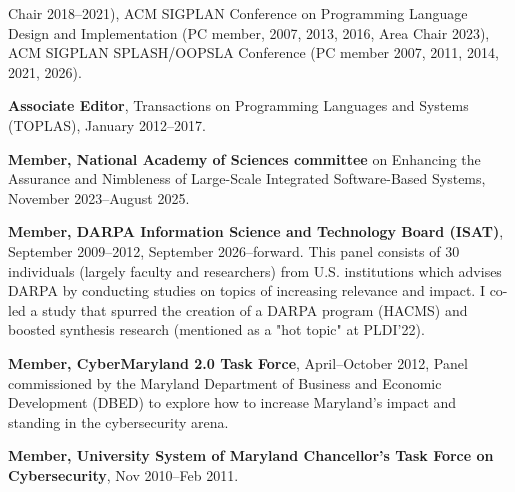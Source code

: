 \documentclass[11pt]{article}
\begin{document}
\begin{description}
  Chair 2018--2021), ACM SIGPLAN Conference on Programming Language
  Design and Implementation (PC member, 2007, 2013, 2016, Area Chair
  2023), ACM SIGPLAN SPLASH/OOPSLA Conference (PC member 2007, 2011, 2014, 2021, 2026).
 \item \textbf{Associate Editor}, Transactions on Programming Languages and
   Systems (TOPLAS), January 2012--2017.
 \item \textbf{Member, National Academy of Sciences committee} on
   Enhancing the Assurance and Nimbleness of Large-Scale Integrated
   Software-Based Systems, November 2023--August 2025.
\item \textbf{Member, DARPA Information Science and Technology Board (ISAT)},
  September 2009--2012, September 2026--forward.  This panel consists of 30
    individuals (largely faculty and researchers) from
    U.S. institutions which advises DARPA by conducting studies on
    topics of increasing relevance and impact. I co-led a study that
    spurred the creation of a DARPA program (HACMS) and boosted
    synthesis research (mentioned as a "hot topic" at PLDI’22).  
\item \textbf{Member, CyberMaryland 2.0 Task Force}, April--October
  2012, Panel commissioned by the Maryland Department of Business and
  Economic Development (DBED) to explore how to increase Maryland's
  impact and standing in the cybersecurity arena.
 \item \textbf{Member, University System of Maryland Chancellor’s Task Force on Cybersecurity}, Nov 2010–Feb 2011.

\end{description}
\end{document}
